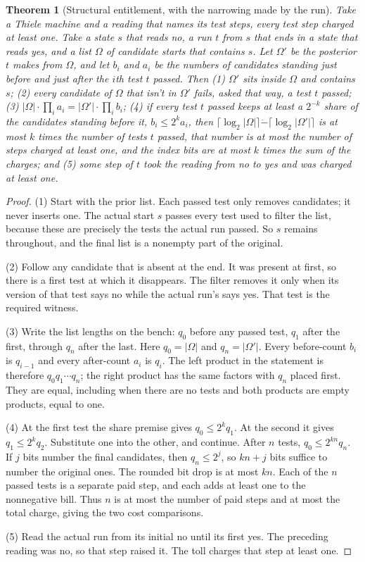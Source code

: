 \documentclass[11pt,twoside]{article}
\theoremstyle{thielethm}
\newtheorem{theorem}{Theorem}[section]
\theoremstyle{thieledef}
\theoremstyle{thieledef}
\theoremstyle{thieledef}
\theoremstyle{thielethm}
\theoremstyle{thieleobs}
\theoremstyle{thielethm}
\begin{document}
\begin{theorem}[Structural entitlement, with the narrowing made by the run]\label{thm:ent-run}
Take a Thiele machine and a reading that names its test steps, every test step charged at
least one. Take a state $s$ that reads no, a run $t$ from $s$ that ends in a state that reads yes,
and a list $\Omega$ of candidate starts that contains $s$. Let $\Omega'$ be the posterior $t$ makes
from $\Omega$, and let $b_i$ and $a_i$ be the numbers of candidates standing just before and just
after the $i$th test $t$ passed. Then (1) $\Omega'$ sits inside $\Omega$ and contains $s$; (2)
every candidate of $\Omega$ that isn't in $\Omega'$ fails, asked that way, a test $t$ passed; (3)
$|\Omega| \cdot \prod_i a_i = |\Omega'| \cdot \prod_i b_i$; (4) if every test $t$ passed keeps at
least a $2^{-k}$ share of the candidates standing before it, $b_i \le 2^k a_i$, then
$\lceil \log_2 |\Omega| \rceil \mathbin{\dot{-}} \lceil \log_2 |\Omega'| \rceil$ is at most $k$ times
the number of tests $t$ passed, that number is at most the number of steps charged at least one,
and the index bits are at most $k$ times the sum of the charges; and (5) some step of $t$ took the
reading from no to yes and was charged at least one.
\end{theorem}

\begin{proof}
(1) Start with the prior list. Each passed test only removes candidates; it
never inserts one. The actual start $s$ passes every test used to filter the
list, because these are precisely the tests the actual run passed. So $s$
remains throughout, and the final list is a nonempty part of the original.

(2) Follow any candidate that is absent at the end. It was present at first,
so there is a first test at which it disappears. The filter removes it only
when its version of that test says no while the actual run's says yes.
That test is the required witness.

(3) Write the list lengths on the bench: $q_0$ before any passed test,
$q_1$ after the first, through $q_n$ after the last. Here $q_0=|\Omega|$
and $q_n=|\Omega'|$. Every before-count $b_i$ is $q_{i-1}$ and every
after-count $a_i$ is $q_i$. The left product in the statement is therefore
$q_0q_1\cdots q_n$; the right product has the same factors with $q_n$ placed
first. They are equal, including when there are no tests and both products
are empty products, equal to one.

(4) At the first test the share premise gives $q_0\le2^kq_1$.
At the second it gives $q_1\le2^kq_2$. Substitute one into the other,
and continue. After $n$ tests, $q_0\le2^{kn}q_n$.
If $j$ bits number the final candidates, then $q_n\le2^j$, so $kn+j$
bits suffice to number the original ones. The rounded bit drop is at most
$kn$. Each of the $n$ passed tests is a separate paid step, and each adds at
least one to the nonnegative bill. Thus $n$ is at most the number of paid
steps and at most the total charge, giving the two cost comparisons.

(5) Read the actual run from its initial no until its first yes.
The preceding reading was no, so that step raised it. The toll charges
that step at least one.
\end{proof}
\end{document}
